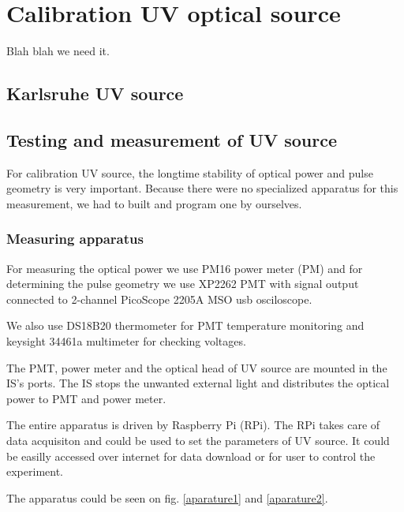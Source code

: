 
\chapter{Calibration UV optical source}
Blah blah we need it.
\section{Karlsruhe UV source}


\section{Testing and measurement of UV source}
For calibration UV source, the longtime stability of optical power and pulse geometry is very important. Because there were no specialized apparatus for this measurement, we had to built and program one by ourselves.
\subsection{Measuring apparatus}
For measuring the optical power we use PM16 power meter (PM) and for determining the pulse geometry we use XP2262 PMT with signal output connected to 2-channel PicoScope 2205A MSO usb osciloscope.
\par
We also use DS18B20 thermometer for PMT temperature monitoring and keysight 34461a multimeter for checking voltages.

\par
The PMT, power meter and the optical head of UV source are mounted in the IS's ports. The IS stops the unwanted external light and distributes the optical power to PMT and power meter. 
\par
The entire apparatus is driven by Raspberry Pi (RPi). The RPi takes care of data acquisiton and could be used to set the parameters of UV source. It could be easilly accessed over internet for data download or for user to control the experiment.
\par


\par
The apparatus could be seen on fig. \ref{aparature1} and \ref{aparature2}.

